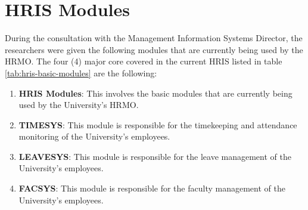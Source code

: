 \chapter{HRIS Modules}

\label{AppendixA}

During the consultation with the Management Information Systems Director, the researchers were given the following modules that are currently being used by the HRMO. The four (4) major core covered in the current HRIS listed in table \ref{tab:hris-basic-modules} are the following:

\begin{enumerate}
    \item \textbf{HRIS Modules}: This involves the basic modules that are currently being used by the University's HRMO.
    \item \textbf{TIMESYS}: This module is responsible for the timekeeping and attendance monitoring of the University's employees.
    \item \textbf{LEAVESYS}: This module is responsible for the leave management of the University's employees.
    \item \textbf{FACSYS}: This module is responsible for the faculty management of the University's employees.
\end{enumerate}

